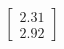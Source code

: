 \documentclass[preview]{standalone}
\begin{document}
\begin{align*}
\begin{bmatrix} 2.31 \\ 2.92 \end{bmatrix}
\end{align*}
\end{document}
